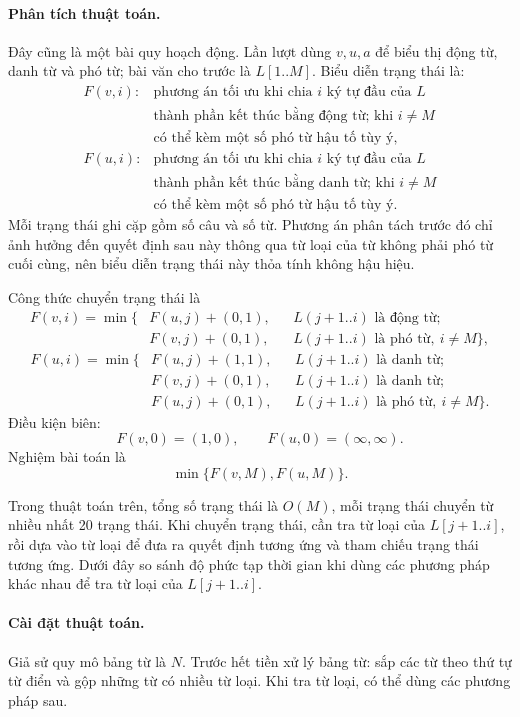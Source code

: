 \documentclass[11pt]{article}
\begin{document}
\paragraph{Phân tích thuật toán.}
Đây cũng là một bài quy hoạch động. Lần lượt dùng \(v,u,a\) để biểu thị động
từ, danh từ và phó từ; bài văn cho trước là \(L[1..M]\). Biểu diễn trạng thái
là:
\[
\begin{array}{ll}
F(v,i): & \text{phương án tối ưu khi chia } i \text{ ký tự đầu của } L\\
        & \text{thành phần kết thúc bằng động từ; khi } i\ne M\\
        & \text{có thể kèm một số phó từ hậu tố tùy ý,}\\[0.2em]
F(u,i): & \text{phương án tối ưu khi chia } i \text{ ký tự đầu của } L\\
        & \text{thành phần kết thúc bằng danh từ; khi } i\ne M\\
        & \text{có thể kèm một số phó từ hậu tố tùy ý.}
\end{array}
\]
Mỗi trạng thái ghi cặp gồm số câu và số từ. Phương án phân tách trước đó chỉ
ảnh hưởng đến quyết định sau này thông qua từ loại của từ không phải phó từ
cuối cùng, nên biểu diễn trạng thái này thỏa tính không hậu hiệu.

Công thức chuyển trạng thái là
\[
\begin{aligned}
F(v,i)=\min\{&
  F(u,j)+(0,1), && L(j+1..i)\text{ là động từ};\\
& F(v,j)+(0,1), && L(j+1..i)\text{ là phó từ},\ i\ne M\},
\end{aligned}
\]
\[
\begin{aligned}
F(u,i)=\min\{&
  F(u,j)+(1,1), && L(j+1..i)\text{ là danh từ};\\
& F(v,j)+(0,1), && L(j+1..i)\text{ là danh từ};\\
& F(u,j)+(0,1), && L(j+1..i)\text{ là phó từ},\ i\ne M\}.
\end{aligned}
\]
Điều kiện biên:
\[
  F(v,0)=(1,0),\qquad F(u,0)=(\infty,\infty).
\]
Nghiệm bài toán là
\[
  \min\{F(v,M),F(u,M)\}.
\]

Trong thuật toán trên, tổng số trạng thái là \(O(M)\), mỗi trạng thái chuyển
từ nhiều nhất 20 trạng thái. Khi chuyển trạng thái, cần tra từ loại của
\(L[j+1..i]\), rồi dựa vào từ loại để đưa ra quyết định tương ứng và tham
chiếu trạng thái tương ứng. Dưới đây so sánh độ phức tạp thời gian khi dùng
các phương pháp khác nhau để tra từ loại của \(L[j+1..i]\).

\paragraph{Cài đặt thuật toán.}
Giả sử quy mô bảng từ là \(N\). Trước hết tiền xử lý bảng từ: sắp các từ theo
thứ tự từ điển và gộp những từ có nhiều từ loại. Khi tra từ loại, có thể dùng
các phương pháp sau.
\end{document}
